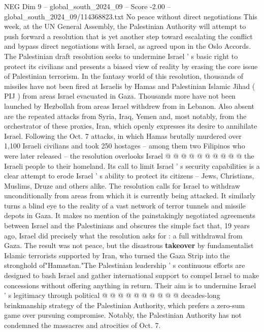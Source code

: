 \begin{textsample}{NEG Dim 9 – global\_south\_2024\_09 – Score -2.00 – global\_south\_2024\_09/114368823.txt}  \label{ex:f9_neg_201}
No peace without direct negotiations This week, at the UN General Assembly, the Palestinian Authority will attempt to push forward a resolution that is yet another step toward escalating the conflict and bypass direct negotiations with Israel, as agreed upon in the Oslo Accords.
The Palestinian draft resolution seeks to undermine Israel ' s basic right to protect its civilians and presents a biased view of reality by erasing the core issue of Palestinian terrorism.
In the fantasy world of this resolution, thousands of missiles have not been fired at Israelis by Hamas and Palestinian Islamic Jihad ( PIJ ) from areas Israel evacuated in Gaza.
Thousands more have not been launched by Hezbollah from areas Israel withdrew from in Lebanon.
Also absent are the repeated attacks from Syria, Iraq, Yemen and, most notably, from the orchestrator of these proxies, Iran, which openly expresses its desire to annihilate Israel.
Following the Oct. 7 attacks, in which Hamas brutally murdered over 1,100 Israeli civilians and took 250 hostages -- among them two Filipinos who were later released -- the resolution overlooks Israel @ @ @ @ @ @ @ @ @ @ the Israeli people to their homeland.
Its call to limit Israel ' s security capabilities is a clear attempt to erode Israel ' s ability to protect its citizens -- Jews, Christians, Muslims, Druze and others alike.
The resolution calls for Israel to withdraw unconditionally from areas from which it is currently being attacked.
It similarly turns a blind eye to the reality of a vast network of terror tunnels and missile depots in Gaza.
It makes no mention of the painstakingly negotiated agreements between Israel and the Palestinians and obscures the simple fact that, 19 years ago, Israel did precisely what the resolution asks for : a full withdrawal from Gaza.
The result was not peace, but the disastrous \textbf{takeover} by fundamentalist Islamic terrorists supported by Iran, who turned the Gaza Strip into the stronghold of"Hamastan."The Palestinian leadership ' s continuous efforts are designed to bash Israel and gather international support to compel Israel to make concessions without offering anything in return.
Their aim is to undermine Israel ' s legitimacy through political @ @ @ @ @ @ @ @ @ @ decades-long brinkmanship strategy of the Palestinian Authority, which prefers a zero-sum game over pursuing compromise.
Notably, the Palestinian Authority has not condemned the massacres and atrocities of Oct. 7.

\end{textsample}
